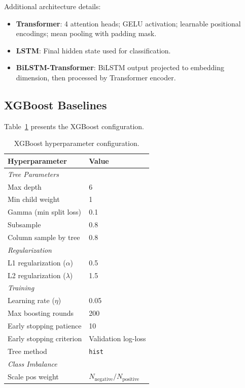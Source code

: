 \documentclass{article}
\theoremstyle{plain}
\theoremstyle{definition}
\theoremstyle{remark}
\begin{document}
Additional architecture details:
\begin{itemize}
    \item \textbf{Transformer}: 4 attention heads; GELU activation; learnable positional encodings; mean pooling with padding mask.
    \item \textbf{LSTM}: Final hidden state used for classification.
    \item \textbf{BiLSTM-Transformer}: BiLSTM output projected to embedding dimension, then processed by Transformer encoder.
\end{itemize}

\subsection{XGBoost Baselines}
\label{appendix:xgboost}

Table~\ref{tab:xgboost_config} presents the XGBoost configuration.

\begin{table}[h]
\centering
\caption{XGBoost hyperparameter configuration.}
\label{tab:xgboost_config}
\begin{tabular}{ll}
\toprule
Hyperparameter & Value \\
\midrule
\multicolumn{2}{l}{\textit{Tree Parameters}} \\
Max depth & 6 \\
Min child weight & 1 \\
Gamma (min split loss) & 0.1 \\
Subsample & 0.8 \\
Column sample by tree & 0.8 \\
\midrule
\multicolumn{2}{l}{\textit{Regularization}} \\
L1 regularization ($\alpha$) & 0.5 \\
L2 regularization ($\lambda$) & 1.5 \\
\midrule
\multicolumn{2}{l}{\textit{Training}} \\
Learning rate ($\eta$) & 0.05 \\
Max boosting rounds & 200 \\
Early stopping patience & 10 \\
Early stopping criterion & Validation log-loss \\
Tree method & \texttt{hist} \\
\midrule
\multicolumn{2}{l}{\textit{Class Imbalance}} \\
Scale pos weight & $N_{\text{negative}} / N_{\text{positive}}$ \\
\bottomrule
\end{tabular}
\end{table}
\end{document}
